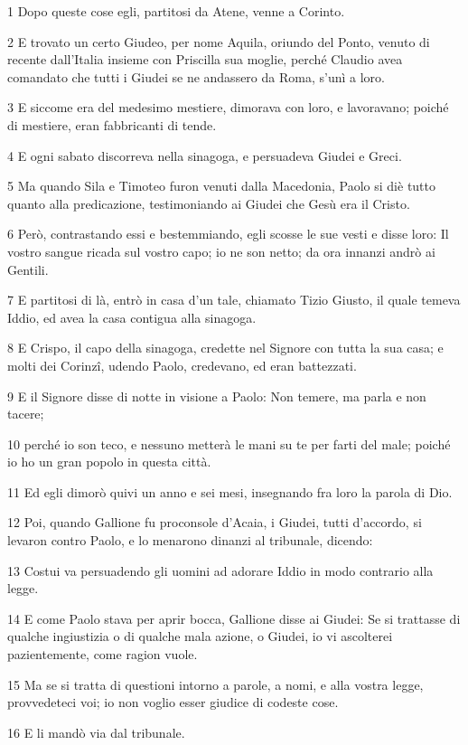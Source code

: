 \par 1 Dopo queste cose egli, partitosi da Atene, venne a Corinto.
\par 2 E trovato un certo Giudeo, per nome Aquila, oriundo del Ponto, venuto di recente dall'Italia insieme con Priscilla sua moglie, perché Claudio avea comandato che tutti i Giudei se ne andassero da Roma, s'unì a loro.
\par 3 E siccome era del medesimo mestiere, dimorava con loro, e lavoravano; poiché di mestiere, eran fabbricanti di tende.
\par 4 E ogni sabato discorreva nella sinagoga, e persuadeva Giudei e Greci.
\par 5 Ma quando Sila e Timoteo furon venuti dalla Macedonia, Paolo si diè tutto quanto alla predicazione, testimoniando ai Giudei che Gesù era il Cristo.
\par 6 Però, contrastando essi e bestemmiando, egli scosse le sue vesti e disse loro: Il vostro sangue ricada sul vostro capo; io ne son netto; da ora innanzi andrò ai Gentili.
\par 7 E partitosi di là, entrò in casa d'un tale, chiamato Tizio Giusto, il quale temeva Iddio, ed avea la casa contigua alla sinagoga.
\par 8 E Crispo, il capo della sinagoga, credette nel Signore con tutta la sua casa; e molti dei Corinzî, udendo Paolo, credevano, ed eran battezzati.
\par 9 E il Signore disse di notte in visione a Paolo: Non temere, ma parla e non tacere;
\par 10 perché io son teco, e nessuno metterà le mani su te per farti del male; poiché io ho un gran popolo in questa città.
\par 11 Ed egli dimorò quivi un anno e sei mesi, insegnando fra loro la parola di Dio.
\par 12 Poi, quando Gallione fu proconsole d'Acaia, i Giudei, tutti d'accordo, si levaron contro Paolo, e lo menarono dinanzi al tribunale, dicendo:
\par 13 Costui va persuadendo gli uomini ad adorare Iddio in modo contrario alla legge.
\par 14 E come Paolo stava per aprir bocca, Gallione disse ai Giudei: Se si trattasse di qualche ingiustizia o di qualche mala azione, o Giudei, io vi ascolterei pazientemente, come ragion vuole.
\par 15 Ma se si tratta di questioni intorno a parole, a nomi, e alla vostra legge, provvedeteci voi; io non voglio esser giudice di codeste cose.
\par 16 E li mandò via dal tribunale.

